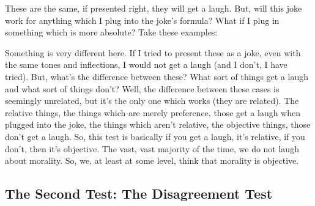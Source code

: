 These are the same, if presented right, they will get a laugh. But, will this joke work for anything which I plug into the joke's formula? What if I plug in something which is more absolute? Take these examples:


Something is very different here. If I tried to present these as a joke, even with the same tones and inflections, I would not get a laugh (and I don't, I have tried). But, what's the difference between these? What sort of things get a laugh and what sort of things don't? Well, the difference between these cases is seemingly unrelated, but it's the only one which works (they are related). The relative things, the things which are merely preference, those get a laugh when plugged into the joke, the things which aren't relative, the objective things, those don't get a laugh.  So, this test is basically if you get a laugh, it's relative, if you don't, then it's objective. The vast, vast majority of the time, we do not laugh about morality. So, we, at least at some level, think that morality is objective. 

\subsection{The Second Test: The Disagreement Test}

